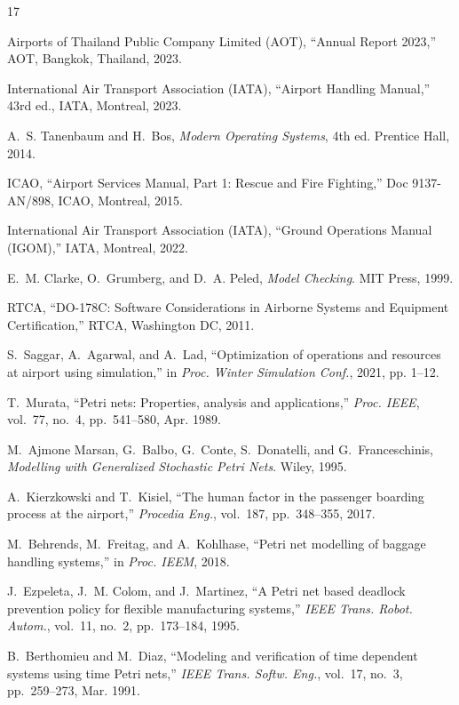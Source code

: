 \documentclass[conference,a4paper]{IEEEtran}
\begin{document}
\begin{thebibliography}{17}

Airports of Thailand Public Company Limited (AOT),
``Annual Report 2023,'' AOT, Bangkok, Thailand, 2023.

International Air Transport Association (IATA),
``Airport Handling Manual,'' 43rd ed., IATA, Montreal, 2023.

A.~S. Tanenbaum and H.~Bos,
\textit{Modern Operating Systems}, 4th ed.
Prentice Hall, 2014.

ICAO,
``Airport Services Manual, Part 1: Rescue and Fire Fighting,''
Doc 9137-AN/898, ICAO, Montreal, 2015.

International Air Transport Association (IATA),
``Ground Operations Manual (IGOM),'' IATA, Montreal, 2022.

E.~M. Clarke, O.~Grumberg, and D.~A. Peled,
\textit{Model Checking}.
MIT Press, 1999.

RTCA,
``DO-178C: Software Considerations in Airborne Systems and Equipment
Certification,'' RTCA, Washington DC, 2011.

S.~Saggar, A.~Agarwal, and A.~Lad,
``Optimization of operations and resources at airport using simulation,''
in \textit{Proc. Winter Simulation Conf.}, 2021, pp. 1--12.

T.~Murata,
``Petri nets: Properties, analysis and applications,''
\textit{Proc. IEEE}, vol.~77, no.~4, pp.~541--580, Apr. 1989.

M.~Ajmone Marsan, G.~Balbo, G.~Conte, S.~Donatelli, and G.~Franceschinis,
\textit{Modelling with Generalized Stochastic Petri Nets}.
Wiley, 1995.

A.~Kierzkowski and T.~Kisiel,
``The human factor in the passenger boarding process at the airport,''
\textit{Procedia Eng.}, vol.~187, pp.~348--355, 2017.

M.~Behrends, M.~Freitag, and A.~Kohlhase,
``Petri net modelling of baggage handling systems,''
in \textit{Proc. IEEM}, 2018.

J.~Ezpeleta, J.~M. Colom, and J.~Martinez,
``A Petri net based deadlock prevention policy for flexible manufacturing
systems,''
\textit{IEEE Trans. Robot. Autom.}, vol.~11, no.~2, pp.~173--184, 1995.

B.~Berthomieu and M.~Diaz,
``Modeling and verification of time dependent systems using time Petri nets,''
\textit{IEEE Trans. Softw. Eng.}, vol.~17, no.~3, pp.~259--273, Mar. 1991.


\end{thebibliography}
\end{document}
